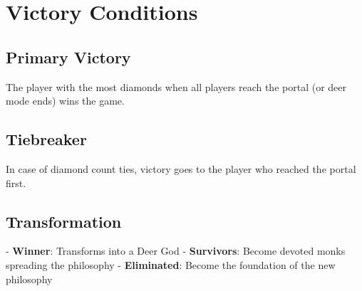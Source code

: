 \documentclass[12pt,a4paper]{article}
\begin{document}
\section{Victory Conditions}

\subsection{Primary Victory}
The player with the most diamonds when all players reach the portal (or deer mode ends) wins the game.

\subsection{Tiebreaker}
In case of diamond count ties, victory goes to the player who reached the portal first.

\subsection{Transformation}
- \textbf{Winner}: Transforms into a Deer God
- \textbf{Survivors}: Become devoted monks spreading the philosophy  
- \textbf{Eliminated}: Become the foundation of the new philosophy
\end{document}

